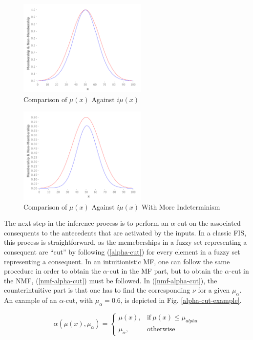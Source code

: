 \documentclass[conference]{IEEEtran}
\begin{document}
\begin{figure}[!t]
  \centering
  \includegraphics[width=2.5in]{if-membership}
  \caption{Comparison of $\mu(x)$ Against $i\mu(x)$}
  \label{if-membership}
\end{figure}

\begin{figure}[!t]
  \centering
  \includegraphics[width=2.5in]{if-membership-drastic}
  \caption{Comparison of $\mu(x)$ Against $i\mu(x)$ With More Indeterminism}
  \label{if-membership-drastic}
\end{figure}

The next step in the inference process is to perform an $\alpha$-cut
on the associated consequents to the antecedents that are activated by
the inputs. In a classic FIS, this process is straightforward, as the
memeberships in a fuzzy set representing a consequent are ``cut'' by
following (\ref{alpha-cut}) for every element in a fuzzy set
representing a consequent. In an intuitionistic MF, one can follow
the same procedure in order to obtain the $\alpha$-cut in the MF part,
but to obtain the $\alpha$-cut in the NMF, (\ref{nmf-alpha-cut}) must
be followed. In (\ref{nmf-alpha-cut}), the counterintuitive part is
that one has to find the corresponding $\nu$ for a given
$\mu_{\alpha}$. An example of an $\alpha$-cut, with $\mu_{\alpha} =
0.6$, is depicted in Fig. \ref{alpha-cut-example}.

\begin{equation}
  \label{alpha-cut}
  \alpha(\mu (x),\mu_{\alpha}) =
  \begin{cases}
    \mu (x), & \text{if}\ \mu (x) \leq \mu_{alpha}  \\
    \mu_{\alpha}, & \text{otherwise}
  \end{cases}
\end{equation}
\end{document}
